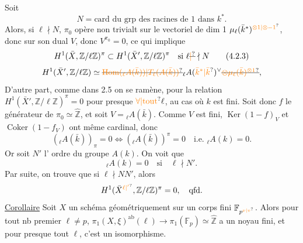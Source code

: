  Soit
\[N=\text{card du grp des racines de 1 dans }k^*.\tag*{(4.2.2)}\]
Alors, si \deleted{\unsure{$\ell\nmid$}} $\ell\nmid N$,  $\pi_0$ opère non trivialt sur le   vectoriel de dim 1 $\mu_\ell(\bar k^*)^{\unsure{\otimes1|\otimes-1}}$, donc sur son dual $V$, donc  $V^{\pi_0}=0$, ce qui implique
\[H^1(\bar X,\mathbb Z/\ell\mathbb Z)^\pi\subset H^1(\bar X',\mathbb Z/\ell\mathbb Z)^\pi\quad\text{si }\ell\deleted{\unsure{\mid}}\nmid N\tag*{(4.2.3)}\]
\[H^1(\bar X',\mathbb Z/\ell\mathbb Z)\simeq\deleted{\unsure{\operatorname{Hom}({}_\ell A(\bar k))|T_\ell(A(\bar k))}}{}_{\ell}A(\unsure{\bar k^*|\bar k})^\vee\deleted{\unsure{\otimes\mu_\ell(\bar k)^{\otimes1}}},\]
D'autre part,  comme dans 2.5 on se ramène, pour la relation  $H^1(\bar X',\mathbb Z/\ell\mathbb Z)^\pi=0$ pour presque $\unsure{\forall|\text{tout}}\ell$, au cas où $k$ est fini.
  Soit donc  $f$ le générateur  de  $\pi_0\simeq\widehat{\mathbb Z}$, et soit $V={}_\ell A(\bar k)$. Comme $V$ est fini, $\operatorname{Ker}(1-f)_V$ et $\operatorname{Coker}(1-f_V)$ ont même cardinal, donc  
\[({}_\ell A(\bar k))_\pi=0\Longleftrightarrow({}_\ell A(\bar k))^\pi=0\quad\text{i.e. }{}_\ell A(k)=0.\]
Or soit $N'$ l' ordre du groupe  $A(k)$. On voit que 
\[{}_\ell A(k)=0\quad\text{si}\quad\ell\nmid N'.\]
Par suite, on trouve que si $\ell\nmid NN'$, alors
\[H^1(\bar X^{\unsure{\ell|'}},\mathbb Z/\ell\mathbb Z)^\pi=0,\quad\text{qfd.}\]
\uline{Corollaire}  Soit $X$ un schéma  géométriquement   sur un corps fini $\mathbb F_{p^{\unsure{\nu|v}}}$. Alors pour tout nb premier $\ell\neq p$,  $\pi_1(X,\xi)^{\mathrm{ab}}(\ell)\longrightarrow\pi_1(\mathbb F_p)\simeq\widehat{\mathbb Z}$  a un noyau fini, et pour presque tout $\ell$, c'est un isomorphisme.
